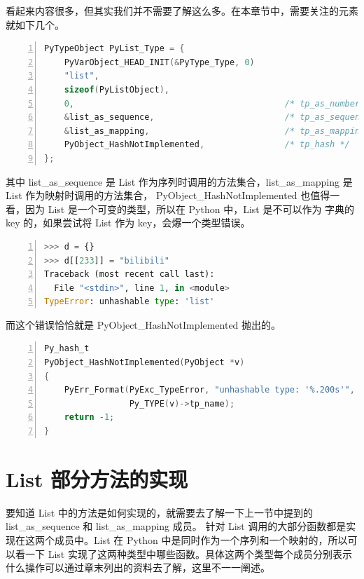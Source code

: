 看起来内容很多，但其实我们并不需要了解这么多。在本章节中，需要关注的元素就如下几个。

\begin{lstlisting}[language=C, numbers=left, numbersep=1em, numberstyle=\footnotesize , breaklines=true]
PyTypeObject PyList_Type = {
    PyVarObject_HEAD_INIT(&PyType_Type, 0)
    "list",
    sizeof(PyListObject),
    0,                                          /* tp_as_number */
    &list_as_sequence,                          /* tp_as_sequence */
    &list_as_mapping,                           /* tp_as_mapping */
    PyObject_HashNotImplemented,                /* tp_hash */
};
\end{lstlisting}

其中 list\_as\_sequence 是 List 作为序列时调用的方法集合，list\_as\_mapping 是 List 作为映射时调用的方法集合，
PyObject\_HashNotImplemented 也值得一看，因为 List 是一个可变的类型，所以在 Python 中，List 是不可以作为
字典的 key 的，如果尝试将 List 作为 key，会爆一个类型错误。

\begin{lstlisting}[language=Python, numbers=left, numbersep=1em, numberstyle=\footnotesize , breaklines=true]
>>> d = {}
>>> d[[233]] = "bilibili"
Traceback (most recent call last):
  File "<stdin>", line 1, in <module>
TypeError: unhashable type: 'list'
\end{lstlisting}

而这个错误恰恰就是 PyObject\_HashNotImplemented 抛出的。

\begin{lstlisting}[language=C, numbers=left, numbersep=1em, numberstyle=\footnotesize , breaklines=true]
Py_hash_t
PyObject_HashNotImplemented(PyObject *v)
{
    PyErr_Format(PyExc_TypeError, "unhashable type: '%.200s'",
                 Py_TYPE(v)->tp_name);
    return -1;
}
\end{lstlisting}

\section{List 部分方法的实现}

要知道 List 中的方法是如何实现的，就需要去了解一下上一节中提到的 list\_as\_sequence 和 list\_as\_mapping 成员。
针对 List 调用的大部分函数都是实现在这两个成员中。List 在 Python 中是同时作为一个序列和一个映射的，所以可以看一下
 List 实现了这两种类型中哪些函数。具体这两个类型每个成员分别表示什么操作可以通过章末列出的资料去了解，这里不一一阐述。

